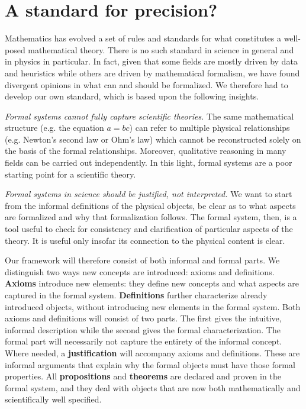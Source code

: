 \documentclass[twocolumn]{article}
\begin{document}
\section{A standard for precision?}

Mathematics has evolved a set of rules and standards for what constitutes a well-posed mathematical theory. There is no such standard in science in general and in physics in particular. In fact, given that some fields are mostly driven by data and heuristics while others are driven by mathematical formalism, we have found divergent opinions in what can and should be formalized. We therefore had to develop our own standard, which is based upon the following insights.

\textit{Formal systems cannot fully capture scientific theories.} The same mathematical structure (e.g. the equation $a= bc$) can refer to multiple physical relationships (e.g. Newton's second law or Ohm's law) which cannot be reconstructed solely on the basis of the formal relationships. Moreover, qualitative reasoning in many fields can be carried out independently. In this light, formal systems are a poor starting point for a scientific theory.

\textit{Formal systems in science should be justified, not interpreted.} We want to start from the informal definitions of the physical objects, be clear as to what aspects are formalized and why that formalization follows. The formal system, then, is a tool useful to check for consistency and clarification of particular aspects of the theory. It is useful only insofar its connection to the physical content is clear.

Our framework will therefore consist of both informal and formal parts. We distinguish two ways new concepts are introduced: axioms and definitions. \textbf{Axioms} introduce new elements: they define new concepts and what aspects are captured in the formal system.  \textbf{Definitions} further characterize already introduced objects, without introducing new elements in the formal system. Both axioms and definitions will consist of two parts. The first gives the intuitive, informal description while the second gives the formal characterization. The formal part will necessarily not capture the entirety of the informal concept. Where needed, a \textbf{justification} will accompany axioms and definitions. These are informal arguments that explain why the formal objects must have those formal properties. All \textbf{propositions} and \textbf{theorems} are declared and proven in the formal system, and they deal with objects that are now both mathematically and scientifically well specified.
\end{document}
